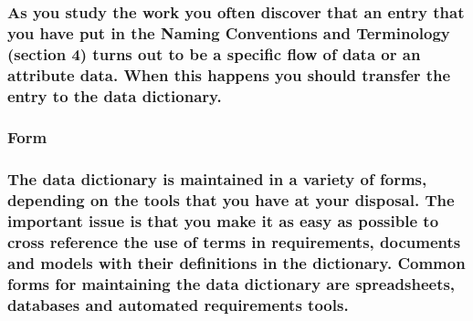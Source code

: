 \documentclass[
]{article}
\begin{document}
\hypertarget{as-you-study-the-work-you-often-discover-that-an-entry-that-you-have-put-in-the-naming-conventions-and-terminology-section-4-turns-out-to-be-a-specific-flow-of-data-or-an-attribute-data.-when-this-happens-you-should-transfer-the-entry-to-the-data-dictionary.}{%
\subsubsection{As you study the work you often discover that an entry
that you have put in the Naming Conventions and Terminology (section 4)
turns out to be a specific flow of data or an attribute data. When this
happens you should transfer the entry to the data
dictionary.}\label{as-you-study-the-work-you-often-discover-that-an-entry-that-you-have-put-in-the-naming-conventions-and-terminology-section-4-turns-out-to-be-a-specific-flow-of-data-or-an-attribute-data.-when-this-happens-you-should-transfer-the-entry-to-the-data-dictionary.}}

\hypertarget{form-25}{%
\subsubsection{Form}\label{form-25}}

\hypertarget{the-data-dictionary-is-maintained-in-a-variety-of-forms-depending-on-the-tools-that-you-have-at-your-disposal.-the-important-issue-is-that-you-make-it-as-easy-as-possible-to-cross-reference-the-use-of-terms-in-requirements-documents-and-models-with-their-definitions-in-the-dictionary.-common-forms-for-maintaining-the-data-dictionary-are-spreadsheets-databases-and-automated-requirements-tools.}{%
\subsubsection{The data dictionary is maintained in a variety of forms,
depending on the tools that you have at your disposal. The important
issue is that you make it as easy as possible to cross reference the use
of terms in requirements, documents and models with their definitions in
the dictionary. Common forms for maintaining the data dictionary are
spreadsheets, databases and automated requirements
tools.}\label{the-data-dictionary-is-maintained-in-a-variety-of-forms-depending-on-the-tools-that-you-have-at-your-disposal.-the-important-issue-is-that-you-make-it-as-easy-as-possible-to-cross-reference-the-use-of-terms-in-requirements-documents-and-models-with-their-definitions-in-the-dictionary.-common-forms-for-maintaining-the-data-dictionary-are-spreadsheets-databases-and-automated-requirements-tools.}}
\end{document}
